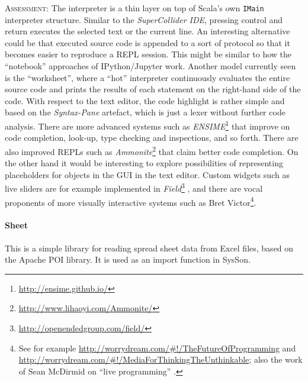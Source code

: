 \documentclass[11pt,a4paper]{article}
\newcommand{\software}[1]{\textit{#1}}
\newcommand{\sysson}[0]{SysSon}
\newcommand{\assessment}[0]{\textsc{Assessment:}}
\begin{document}
\assessment{} The interpreter is a thin layer on top of Scala's own \verb!IMain! interpreter structure. Similar to the \software{SuperCollider IDE}, pressing control and return executes the selected text or the current line. An interesting alternative could be that executed source code is appended to a sort of protocol so that it becomes easier to reproduce a REPL session. This might be similar to how the ``notebook'' approaches of IPython/Jupyter work. Another model currently seen is the ``worksheet'', where a ``hot'' interpreter continuously evaluates the entire source code and prints the results of each statement on the right-hand side of the code. With respect to the text editor, the code highlight is rather simple and based on the \software{Syntax-Pane} artefact, which is just a lexer without further code analysis. There are more advanced systems such as \software{ENSIME}\footnote{\url{http://ensime.github.io/}} that improve on code completion, look-up, type checking and inspections, and so forth. There are also improved REPLs such as \software{Ammonite}\footnote{\url{http://www.lihaoyi.com/Ammonite/}} that claim better code completion. On the other hand it would be interesting to explore possibilities of representing placeholders for objects in the GUI in the text editor. Custom widgets such as live sliders are for example implemented in \software{Field}\footnote{\url{http://openendedgroup.com/field/}} \autocite{downie2008field}, and there are vocal proponents of more visually interactive systems such as Bret Victor\footnote{See for example \url{http://worrydream.com/\#!/TheFutureOfProgramming} and \url{http://worrydream.com/\#!/MediaForThinkingTheUnthinkable}; 
also the work of Sean McDirmid on ``live programming'' \autocite{mcdirmid2013usable}.}.

%

\paragraph{Sheet}

This is a simple library for reading spread sheet data from Excel files, based on the Apache POI library. It is used as an import function in \sysson{}.
\end{document}
